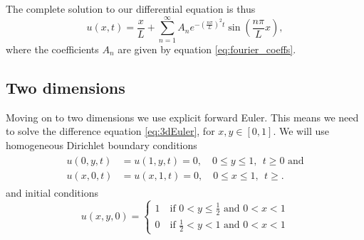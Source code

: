 \documentclass[reprint, english,notitlepage,nofootinbib]{revtex4-1}  %
\begin{document}
The complete solution to our differential equation is thus
\begin{equation}
\label{eq:exact_solution_1D}
u(x, t) = \frac{x}{L} + \sum_{n=1}^\infty A_n e^{- \left( \frac{n \pi}{L} \right)^2 t} \sin( \frac{n \pi}{L} x),
\end{equation}
where the coefficients $A_n$ are given by equation \eqref{eq:fourier_coeffs}.

\subsection{Two dimensions}
Moving on to two dimensions we use explicit forward Euler. This means we need to solve the difference equation \eqref{eq:3dEuler}, for $x, y \in [0,1]$. We will use homogeneous Dirichlet boundary conditions
\begin{align}
	\label{eq:2D_bound}
	\begin{split}
	u(0, y, t) &= u(1, y, t) = 0, \quad 0\leq y \leq 1, \ \ t\geq 0 \text{ and}\\
	u(x, 0, t) &= u(x, 1, t) = 0, \quad 0\leq x \leq 1, \ \ t\geq.
	\end{split}
\end{align}
and initial conditions
\begin{equation}
\label{eq:2D_init}
	u(x,y,0) = 
	\begin{cases}
	1\quad \text{if }0<y\leq \frac{1}{2}\text{ and } 0<x<1 \\
	0\quad \text{if }\frac{1}{2}<y<1\text{ and } 0<x<1
	\end{cases}
\end{equation}
\end{document}
